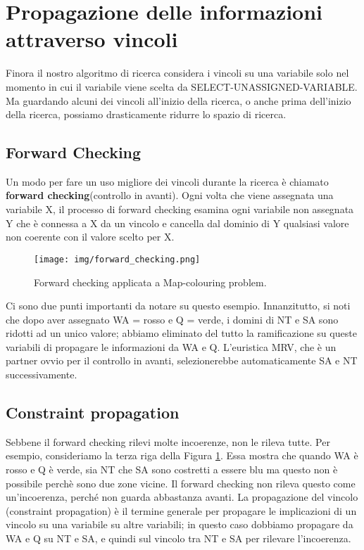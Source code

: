 \section{Propagazione delle informazioni attraverso vincoli}
Finora il nostro algoritmo di ricerca considera i vincoli su una variabile solo nel momento in cui il variabile viene scelta da SELECT-UNASSIGNED-VARIABLE. Ma guardando alcuni dei
vincoli all'inizio della ricerca, o anche prima dell'inizio della ricerca, possiamo drasticamente ridurre lo spazio di ricerca.

\subsection{Forward Checking}

Un modo per fare un uso migliore dei vincoli durante la ricerca è chiamato \textbf{forward checking}(controllo in avanti). Ogni volta che viene assegnata una variabile X, il processo di forward checking esamina ogni variabile non assegnata Y che è connessa a X da un vincolo e cancella dal dominio di Y qualsiasi valore non coerente con il valore scelto per X.
\begin{figure}[H]
    \centering
    \texttt{[image: img/forward\_checking.png]}
    \caption{Forward checking applicata a Map-colouring problem.}\label{fig:forward_checking}
\end{figure}

Ci sono due punti importanti da notare su questo esempio. Innanzitutto, si noti che dopo aver assegnato WA = rosso e Q = verde, i domini di NT e SA
sono ridotti ad un unico valore; abbiamo eliminato del tutto la ramificazione su queste variabili di propagare le informazioni da WA e Q. L'euristica MRV, che è un partner ovvio per il controllo in avanti, selezionerebbe automaticamente SA e NT successivamente.

\subsection{Constraint propagation}
Sebbene il forward checking rilevi molte incoerenze, non le rileva tutte. Per esempio, consideriamo la terza riga della Figura \ref{fig:forward_checking}. Essa mostra che quando WA è rosso e Q è verde, sia NT che SA sono costretti a essere blu ma questo non è possibile perchè sono due zone vicine. Il forward checking non rileva questo come un'incoerenza, perché non guarda abbastanza avanti. La propagazione del vincolo (constraint propagation) è il termine generale per propagare le implicazioni di un vincolo su una variabile su altre variabili; in questo caso dobbiamo propagare da WA e Q su NT e SA, e quindi sul vincolo tra NT e SA per rilevare l'incoerenza. 

